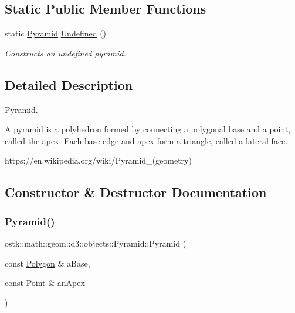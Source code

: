 \subsection*{Static Public Member Functions}
\begin{DoxyCompactItemize}
\item 
static \hyperlink{classostk_1_1math_1_1geom_1_1d3_1_1objects_1_1_pyramid}{Pyramid} \hyperlink{classostk_1_1math_1_1geom_1_1d3_1_1objects_1_1_pyramid_a1da403f46a6f5566358d74b633478135}{Undefined} ()
\begin{DoxyCompactList}\small\item\em Constructs an undefined pyramid. \end{DoxyCompactList}\end{DoxyCompactItemize}


\subsection{Detailed Description}
\hyperlink{classostk_1_1math_1_1geom_1_1d3_1_1objects_1_1_pyramid}{Pyramid}. 

A pyramid is a polyhedron formed by connecting a polygonal base and a point, called the apex. Each base edge and apex form a triangle, called a lateral face.

https\+://en.wikipedia.\+org/wiki/\+Pyramid\+\_\+(geometry) 

\subsection{Constructor \& Destructor Documentation}
\mbox{\label{classostk_1_1math_1_1geom_1_1d3_1_1objects_1_1_pyramid_a5560d123994714b36d4737b358dadcea}} 
\subsubsection{\texorpdfstring{Pyramid()}{Pyramid()}}
{\footnotesize\ttfamily ostk\+::math\+::geom\+::d3\+::objects\+::\+Pyramid\+::\+Pyramid (\begin{DoxyParamCaption}\item[{const \hyperlink{classostk_1_1math_1_1geom_1_1d3_1_1objects_1_1_polygon}{Polygon} \&}]{a\+Base,  }\item[{const \hyperlink{classostk_1_1math_1_1geom_1_1d3_1_1objects_1_1_point}{Point} \&}]{an\+Apex }\end{DoxyParamCaption})}




